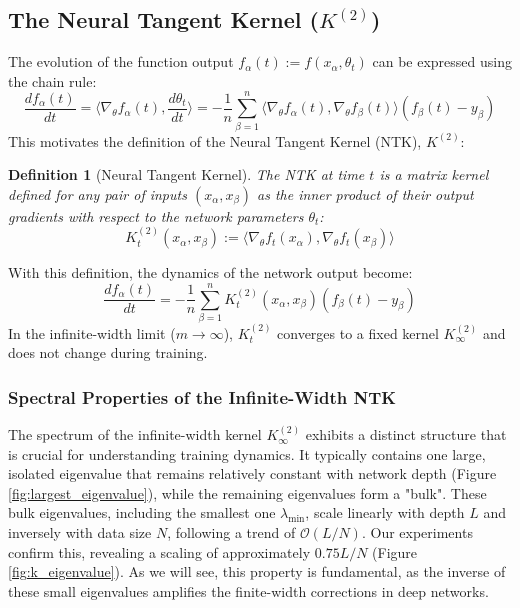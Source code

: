\documentclass{article}
\newtheorem{definition}[theorem]{Definition}
\newcommand{\Ktwo}{K^{(2)}}
\newcommand{\Order}{\mathcal{O}}
\begin{document}
\subsection{The Neural Tangent Kernel ($K^{(2)}$)}
The evolution of the function output $f_\alpha(t) := f(x_\alpha, \theta_t)$ can be expressed using the chain rule:
\begin{equation}
\frac{d f_\alpha(t)}{dt} = \langle \nabla_\theta f_\alpha(t), \frac{d\theta_t}{dt} \rangle = -\frac{1}{n} \sum_{\beta=1}^n \langle \nabla_\theta f_\alpha(t), \nabla_\theta f_\beta(t) \rangle (f_\beta(t) - y_\beta)
\end{equation}
This motivates the definition of the Neural Tangent Kernel (NTK), $K^{(2)}$:
\begin{definition}[Neural Tangent Kernel]
The NTK at time $t$ is a matrix kernel defined for any pair of inputs $(x_\alpha, x_\beta)$ as the inner product of their output gradients with respect to the network parameters $\theta_t$:
\begin{equation}
K^{(2)}_t(x_\alpha, x_\beta) := \langle \nabla_\theta f_t(x_\alpha), \nabla_\theta f_t(x_\beta) \rangle
\end{equation}
\end{definition}
With this definition, the dynamics of the network output become:
\begin{equation}
\frac{d f_\alpha(t)}{dt} = -\frac{1}{n} \sum_{\beta=1}^n K^{(2)}_t(x_\alpha, x_\beta) (f_\beta(t) - y_\beta)
\end{equation}
In the infinite-width limit ($m \to \infty$), $K^{(2)}_t$ converges to a fixed kernel $K^{(2)}_\infty$ and does not change during training.

\subsubsection{Spectral Properties of the Infinite-Width NTK}
The spectrum of the infinite-width kernel $\Ktwo_\infty$ exhibits a distinct structure that is crucial for understanding training dynamics. It typically contains one large, isolated eigenvalue that remains relatively constant with network depth (Figure \ref{fig:largest_eigenvalue}), while the remaining eigenvalues form a "bulk". These bulk eigenvalues, including the smallest one $\lambda_{\min}$, scale linearly with depth $L$ and inversely with data size $N$, following a trend of $\Order(L/N)$. Our experiments confirm this, revealing a scaling of approximately $0.75 L/N$ (Figure \ref{fig:k_eigenvalue}). As we will see, this property is fundamental, as the inverse of these small eigenvalues amplifies the finite-width corrections in deep networks.
\end{document}
